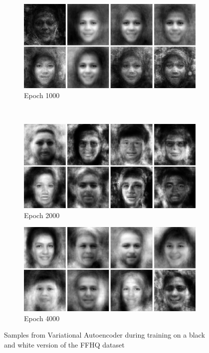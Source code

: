 \begin{figure}[h!]
    \begin{subfigure}[b]{0.45\textwidth}
         \includegraphics[width=\textwidth]{fig/vae/ffhq_epoch1000}
        \caption{Epoch 1000}
    \end{subfigure}
    ~
    \begin{subfigure}[b]{0.45\textwidth}
         \includegraphics[width=\textwidth]{fig/vae/ffhq_epoch2000}
        \caption{Epoch 2000}
    \end{subfigure}

    \begin{subfigure}[b]{\textwidth}
         \includegraphics[width=\textwidth]{fig/vae/ffhq_epoch4000}
        \caption{Epoch 4000}
    \end{subfigure}
    \caption{Samples from Variational Autoencoder  during training on a black and white version of  the FFHQ dataset}
    \label{vaq-bwffhq-samples}
\end{figure}



